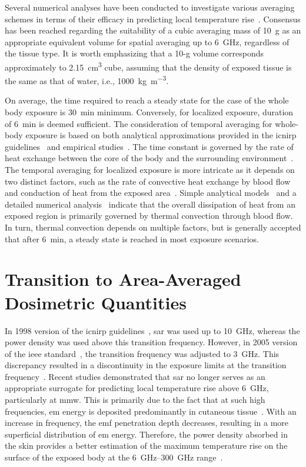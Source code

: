 Several numerical analyses have been conducted to investigate various averaging schemes in terms of their efficacy in predicting local temperature rise~\cite{Hirata2009correlation,McIntosh2011SAR}.
Consensus has been reached regarding the suitability of a cubic averaging mass of \SI{10}{\g} as an appropriate equivalent volume for spatial averaging up to \SI{6}{\GHz}, regardless of the tissue type.
It is worth emphasizing that a 10-g volume corresponds approximately to \SI{2.15}{\cm\cubed} cube, assuming that the density of exposed tissue is the same as that of water, i.e., \SI{1000}{\kg\per\m\cubed}.

On average, the time required to reach a steady state for the case of the whole body exposure is \SI{30}{\minute} minimum.
Conversely, for localized exposure, duration of \SI{6}{\minute} is deemed sufficient.
The consideration of temporal averaging for whole-body exposure is based on both analytical approximations provided in the \gls{icnirp} guidelines~\cite{ICNIRP2020Guidelines} and empirical studies~\cite{Hirata2008FDTD,Nelson2013High}.
The time constant is governed by the rate of heat exchange between the core of the body and the surrounding environment~\cite{Adair2003Thermoregulatory}.
The temporal averaging for localized exposure is more intricate as it depends on two distinct factors, such as the rate of convective heat exchange by blood flow and conduction of heat from the exposed area~\cite{Foster2017Thermal}.
Simple analytical models~\cite{Foster2017Thermal} and a detailed numerical analysis~\cite{Morimoto2017Time} indicate that the overall dissipation of heat from an exposed region is primarily governed by thermal convection through blood flow.
In turn, thermal convection depends on multiple factors, but is generally accepted that after \SI{6}{\minute}, a steady state is reached in most exposure scenarios.

\section{Transition to Area-Averaged Dosimetric Quantities}
In 1998 version of the \gls{icnirp} guidelines~\cite{ICNIRP1998Guidlines}, \gls{sar} was used up to \SI{10}{\GHz}, whereas the power density was used above this transition frequency.
However, in 2005 version of the \gls{ieee} standard~\cite{IEEE2005Standard}, the transition frequency was adjusted to \SI{3}{\GHz}.
This discrepancy resulted in a discontinuity in the exposure limits at the transition frequency~\cite{Colombi2015Implications}.
Recent studies demonstrated that \gls{sar} no longer serves as an appropriate surrogate for predicting local temperature rise above \SI{6}{\GHz}, particularly at \gls{mmw}.
This is primarily due to the fact that at such high frequencies, \gls{em} energy is deposited predominantly in cutaneous tissue~\cite{Ziskin2018Tissue,Zhadobov2011Millimeter}.
With an increase in frequency, the \gls{emf} penetration depth decreases, resulting in a more superficial distribution of \gls{em} energy.
Therefore, the power density absorbed in the skin provides a better estimation of the maximum temperature rise on the surface of the exposed body at the \SIrange{6}{300}{\GHz} range~\cite{Funahashi2018Area-averaged}.

